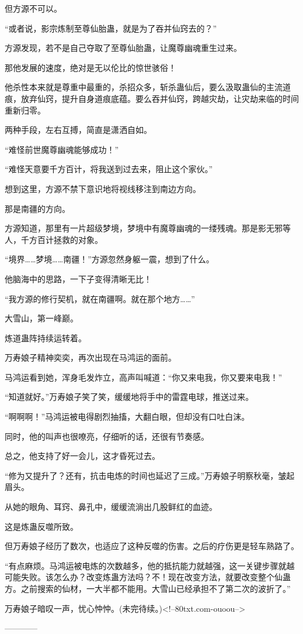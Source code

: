 \begin{this_body}
但方源不可以。

“或者说，影宗炼制至尊仙胎蛊，就是为了吞并仙窍去的？”

方源发现，若不是自己夺取了至尊仙胎蛊，让魔尊幽魂重生过来。

那他发展的速度，绝对是无以伦比的惊世骇俗！

他杀性本来就是尊重中最重的，杀招众多，斩杀蛊仙后，要么汲取蛊仙的主流道痕，放弃仙窍，提升自身道痕底蕴。要么吞并仙窍，跨越灾劫，让灾劫来临的时间重新归零。

两种手段，左右互搏，简直是潇洒自如。

“难怪前世魔尊幽魂能够成功！”

“难怪天意要千方百计，将我送到过去来，阻止这个家伙。”

想到这里，方源不禁下意识地将视线移注到南边方向。

那是南疆的方向。

方源知道，那里有一片超级梦境，梦境中有魔尊幽魂的一缕残魂。那是影无邪等人，千方百计拯救的对象。

“境界……梦境……南疆！”方源忽然身躯一震，想到了什么。

他脑海中的思路，一下子变得清晰无比！

“我方源的修行契机，就在南疆啊。就在那个地方……”

大雪山，第一峰巅。

炼道蛊阵持续运转着。

万寿娘子精神奕奕，再次出现在马鸿运的面前。

马鸿运看到她，浑身毛发炸立，高声叫喊道：“你又来电我，你又要来电我！”

“知道就好。”万寿娘子笑了笑，缓缓地将手中的雷霆电球，推送过来。

“啊啊啊！”马鸿运被电得剧烈抽搐，大翻白眼，但却没有口吐白沫。

同时，他的叫声也很嘹亮，仔细听的话，还很有节奏感。

总之，他支持了好一会儿，这才昏死过去。

“修为又提升了？还有，抗击电炼的时间也延迟了三成。”万寿娘子明察秋毫，皱起眉头。

从她的眼角、耳窍、鼻孔中，缓缓流淌出几股鲜红的血迹。

这是炼蛊反噬所致。

但万寿娘子经历了数次，也适应了这种反噬的伤害。之后的疗伤更是轻车熟路了。

“有点麻烦。马鸿运被电炼的次数越多，他的抵抗能力就越强，这一关键步骤就越可能失败。该怎么办？改变炼蛊方法吗？不！现在改变方法，就要改变整个仙蛊方。之前搜索的仙材，一大半都不能用。大雪山已经承担不了第二次的波折了。”

万寿娘子暗叹一声，忧心忡忡。(未完待续。)<!--80txt.com-ouoou-->

------------

\end{this_body}

